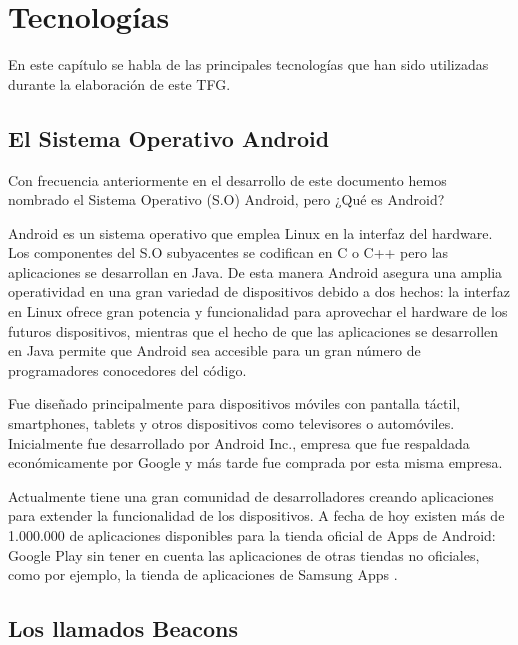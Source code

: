 %
%
%

\cleardoublepage
\chapter{Tecnologías} \label{chap:Tecnologias} 

En este capítulo se habla de las principales tecnologías que han sido utilizadas durante la elaboración de este TFG.


\section{El Sistema Operativo Android}

Con frecuencia anteriormente en el desarrollo de este documento hemos nombrado el Sistema Operativo (S.O) Android, pero ¿Qué es Android?

Android es un sistema operativo que emplea Linux en la interfaz del hardware.  Los componentes del S.O subyacentes se codifican en C o C++ pero las aplicaciones se desarrollan en Java. De esta manera Android asegura una amplia operatividad en una gran variedad de dispositivos debido a dos hechos: la interfaz en Linux ofrece gran potencia y funcionalidad para aprovechar el hardware de los futuros dispositivos, mientras que el hecho de que las aplicaciones se desarrollen en Java permite que Android sea accesible para un gran número de programadores conocedores del código.

Fue diseñado principalmente para dispositivos móviles con pantalla táctil, smartphones, tablets y otros dispositivos como televisores o automóviles. Inicialmente fue desarrollado por Android Inc., empresa que fue respaldada económicamente por Google y más tarde fue comprada por esta misma empresa.

Actualmente tiene una gran comunidad de desarrolladores creando aplicaciones para extender la funcionalidad de los dispositivos. A fecha de hoy existen más de 1.000.000 de aplicaciones disponibles para la tienda oficial de Apps de Android: Google Play \cite{URL::GooglePlay} sin tener en cuenta las aplicaciones de otras tiendas no oficiales, como por ejemplo, la tienda de aplicaciones de Samsung Apps \cite{URL::SamsungApps}.

\section{Los llamados Beacons}

